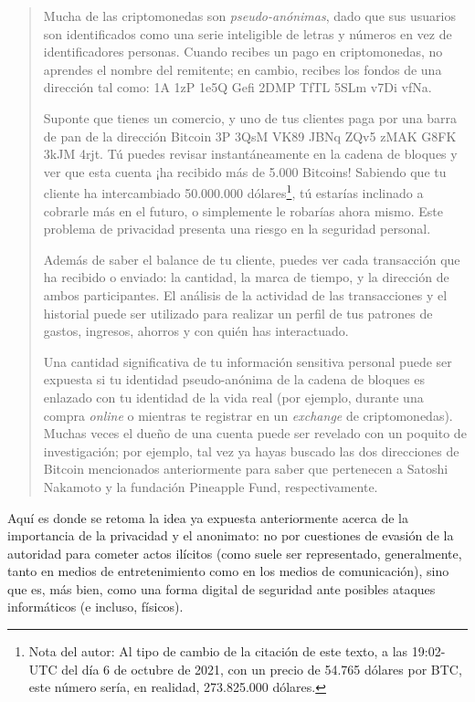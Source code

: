 \documentclass[12pt,a4paper,twoside]{book}
\begin{document}
\begin{quotation}
Mucha de las criptomonedas son \textit{pseudo-anónimas}, dado que sus usuarios son identificados como una serie inteligible de letras y números en vez de identificadores personas. Cuando recibes un pago en criptomonedas, no aprendes el nombre del remitente; en cambio, recibes los fondos de una dirección tal como: 1A 1zP 1e5Q Gefi 2DMP TfTL 5SLm v7Di vfNa.

Suponte que tienes un comercio, y uno de tus clientes paga por una barra de pan de la dirección Bitcoin 3P 3QsM VK89 JBNq ZQv5 zMAK G8FK 3kJM 4rjt. Tú puedes revisar instantáneamente en la cadena de bloques y ver que esta cuenta ¡ha recibido más de 5.000 Bitcoins! Sabiendo que tu cliente ha intercambiado 50.000.000 dólares\footnote{Nota del autor: Al tipo de cambio de la citación de este texto, a las 19:02-UTC del día 6 de octubre de 2021, con un precio de 54.765 dólares por BTC, este número sería, en realidad, 273.825.000 dólares.}, tú estarías inclinado a cobrarle más en el futuro, o simplemente le robarías ahora mismo. Este problema de privacidad presenta una riesgo en la seguridad personal.

Además de saber el balance de tu cliente, puedes ver cada transacción que ha recibido o enviado: la cantidad, la marca de tiempo, y la dirección de ambos participantes. El análisis de la actividad de las transacciones y el historial puede ser utilizado para realizar un perfil de tus patrones de gastos, ingresos, ahorros y con quién has interactuado.

Una cantidad significativa de tu información sensitiva personal puede ser expuesta si tu identidad pseudo-anónima de la cadena de bloques es enlazado con tu identidad de la vida real (por ejemplo, durante una compra \textit{online} o mientras te registrar en un \textit{exchange} de criptomonedas). Muchas veces el dueño de una cuenta puede ser revelado con un poquito de investigación; por ejemplo, tal vez ya hayas buscado las dos direcciones de Bitcoin mencionados anteriormente para saber que pertenecen a Satoshi Nakamoto y la fundación Pineapple Fund, respectivamente. \cite[págs. 21-22]{monero:master}
\end{quotation}

Aquí es donde se retoma la idea ya expuesta anteriormente acerca de la importancia de la privacidad y el anonimato: no por cuestiones de evasión de la autoridad para cometer actos ilícitos (como suele ser representado, generalmente, tanto en medios de entretenimiento como en los medios de comunicación), sino que es, más bien, como una forma digital de seguridad ante posibles ataques informáticos (e incluso, físicos).
\end{document}
